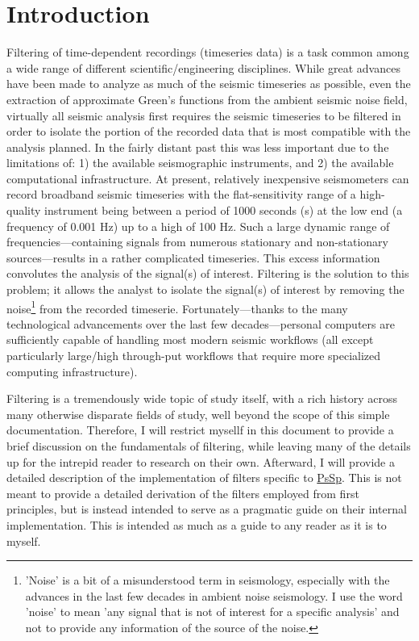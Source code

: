\documentclass[twoside]{article}
\begin{document}
\section{Introduction} \label{Introduction}
Filtering of time-dependent recordings (timeseries data) is a task common among a wide range of different scientific/engineering disciplines.
While great advances have been made to analyze as much of the seismic timeseries as possible, even the extraction of approximate
Green's functions from the ambient seismic noise field, virtually all seismic analysis first requires the seismic timeseries to
be filtered in order to isolate the portion of the recorded data that is most compatible with the analysis planned. In the fairly
distant past this was less important due to the limitations of: 1) the available seismographic instruments, and 2) the available
computational infrastructure. At present, relatively inexpensive seismometers can record broadband seismic timeseries with the flat-sensitivity
range of a high-quality instrument being between a period of 1000 seconds (s) at the low end (a frequency of 0.001 Hz) up to a high
of 100 Hz. Such a large dynamic range of frequencies---containing signals from numerous stationary and non-stationary sources---results in a
rather complicated timeseries. This excess information convolutes the analysis of the signal(s) of interest.
Filtering is the solution to this problem; it allows the analyst to isolate the signal(s) of interest by removing the noise\footnote{'Noise' is a bit of a misunderstood term in
seismology, especially with the advances in the last few decades in ambient noise seismology. I use the word 'noise' to mean 'any
signal that is not of interest for a specific analysis' and not to provide any information of the source of the noise.} from the
recorded timeserie. Fortunately---thanks to the many technological advancements over the last few decades---personal computers are sufficiently
capable of handling most modern seismic workflows (all except particularly large/high through-put workflows that require more specialized
computing infrastructure).

Filtering is a tremendously wide topic of study itself, with a rich history across many otherwise disparate fields of study, well
beyond the scope of this simple documentation. Therefore, I will restrict mysellf in this document to provide a brief discussion
on the fundamentals of filtering, while leaving many of the details up for the intrepid reader to research on their own. Afterward,
I will provide a detailed description of the implementation of filters specific to \href{https://github.com/arbCoding/PsSp}{PsSp}.
This is not meant to provide a detailed derivation of the filters employed from first principles, but is instead intended to serve as
a pragmatic guide on their internal implementation. This is intended as much as a guide to any reader as it is to myself.
\end{document}

